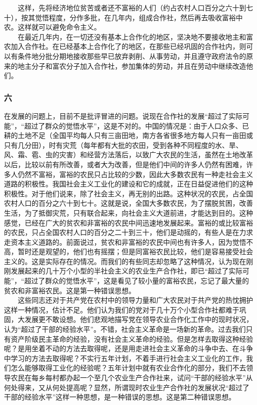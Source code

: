 \documentclass[cn,11pt,chinese]{elegantbook}
\def\myformat#1{\hfil\hfil #1}
\begin{document}
　　这样，先将经济地位贫苦或者还不富裕的人们（约占农村人口百分之六十到七十），按其觉悟程度，分作多批，在几年内，组成合作社，然后再去吸收富裕中农。这样就可以避免命令主义。\\
　　在最近几年内，在一切还没有基本上合作化的地区，坚决地不要接收地主和富农加入合作社。在已经基本上合作化了的地区，在那些已经巩固的合作社内，则可以有条件地分批分期地接收那些早已放弃剥削、从事劳动，并且遵守政府法令的原来的地主分子和富农分子加入合作社，参加集体的劳动，并且在劳动中继续改造他们。\\
\subsubsection*{\myformat{六}}
在发展的问题上，目前不是批评冒进的问题。说现在合作社的发展“超过了实际可能”，“超过了群众的觉悟水平”，这是不对的。中国的情况是：由于人口众多、已耕的土地不足（全国平均每人只有三亩田地，南方各省很多地方每人只有一亩田或只有几分田），时有灾荒（每年都有大批的农田，受到各种不同程度的水、旱、风、霜、雹、虫的灾害）和经营方法落后，以致广大农民的生活，虽然在土地改革以后，比较以前有所改善，或者大为改善，但是他们中间的许多人仍然有困难，许多人仍然不富裕，富裕的农民只占比较的少数，因此大多数农民有一种走社会主义道路的积极性。我国社会主义工业化的建设和它的成就，正在日益促进他们的这种积极性。对于他们说来，除了社会主义，再无别的出路。这种状况的农民，占全国农村人口的百分之六十到七十。这就是说，全国大多数农民，为了摆脱贫困，改善生活，为了抵御灾荒，只有联合起来，向社会主义大道前进，才能达到目的。这种感觉，已经在广大的贫农和非富裕的农民中间迅速地发展起来。富裕的或比较富裕的农民，只占全国农村人口的百分之二十到三十，他们是动摇的，有些人是在力求走资本主义道路的。前面说过，贫农和非富裕的农民中间也有许多人，因为觉悟不高，暂时还是观望的，他们也有摇摆；但是同富裕农民比较，他们是容易接受社会主义的。这是实际存在的情况。而我们的有些同志却忽略了这种情况，认为现在刚刚发展起来的几十万个小型的半社会主义的农业生产合作社，即已“超过了实际可能”，“超过了群众的觉悟水平”，这是看见了较小量的富裕农民，忘记了最大量的贫农和非富裕农民。这是第一种错误思想。\\
　　这些同志还对于共产党在农村中的领导力量和广大农民对于共产党的热忱拥护这样一种情况，估计不足。他们认为我们的党对于几十万个小型合作社都难于巩固，大发展更不敢设想。他们悲观地描写党在领导农业合作化工作中的现时状况，认为“超过了干部的经验水平”。不错，社会主义革命是一场新的革命。过去我们只有资产阶级民主革命的经验，没有社会主义革命的经验。但是怎样去取得这种经验呢？是用坐着不动的方法去取得呢，还是用走进社会主义革命的斗争中去、在斗争中学习的方法去取得呢？不实行五年计划，不着手进行社会主义工业化的工作，我们怎么能够取得工业化的经验呢？五年计划中就有农业合作化的部分，我们不去领导农民在每乡每村都办起一个至几个农业生产合作社来，试问“干部的经验水平”从何处得来，又从何处提高呢？显然，所谓现时农业生产合作社的发展状况“超过了干部的经验水平”这样一种思想，是一种错误的思想。这是第二种错误思想。\\
\end{document}
